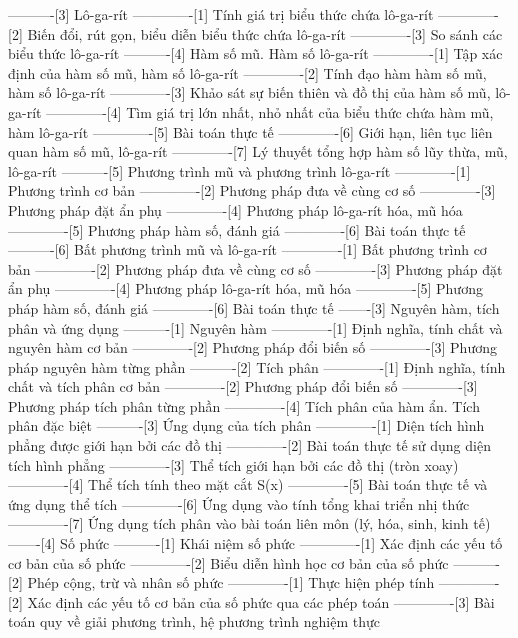 ----------[3] Lô-ga-rít
-------------[1] Tính giá trị biểu thức chứa lô-ga-rít
-------------[2] Biến đổi, rút gọn, biểu diễn biểu thức chứa lô-ga-rít
-------------[3] So sánh các biểu thức lô-ga-rít
----------[4] Hàm số mũ. Hàm số lô-ga-rít
-------------[1] Tập xác định của hàm số mũ, hàm số lô-ga-rít
-------------[2] Tính đạo hàm hàm số mũ, hàm số lô-ga-rít
-------------[3] Khảo sát sự biến thiên và đồ thị của hàm số mũ, lô-ga-rít
-------------[4] Tìm giá trị lớn nhất, nhỏ nhất của biểu thức chứa hàm mũ, hàm lô-ga-rít
-------------[5] Bài toán thực tế
-------------[6] Giới hạn, liên tục liên quan hàm số mũ, lô-ga-rít
-------------[7] Lý thuyết tổng hợp hàm số lũy thừa, mũ, lô-ga-rít
----------[5] Phương trình mũ và phương trình lô-ga-rít
-------------[1] Phương trình cơ bản
-------------[2] Phương pháp đưa về cùng cơ số
-------------[3] Phương pháp đặt ẩn phụ
-------------[4] Phương pháp lô-ga-rít hóa, mũ hóa
-------------[5] Phương pháp hàm số, đánh giá
-------------[6] Bài toán thực tế
----------[6] Bất phương trình mũ và lô-ga-rít
-------------[1] Bất phương trình cơ bản
-------------[2] Phương pháp đưa về cùng cơ số
-------------[3] Phương pháp đặt ẩn phụ
-------------[4] Phương pháp lô-ga-rít hóa, mũ hóa
-------------[5] Phương pháp hàm số, đánh giá
-------------[6] Bài toán thực tế
-------[3] Nguyên hàm, tích phân và ứng dụng
----------[1] Nguyên hàm
-------------[1] Định nghĩa, tính chất và nguyên hàm cơ bản
-------------[2] Phương pháp đổi biến số
-------------[3] Phương pháp nguyên hàm từng phần
----------[2] Tích phân
-------------[1] Định nghĩa, tính chất và tích phân cơ bản
-------------[2] Phương pháp đổi biến số
-------------[3] Phương pháp tích phân từng phần
-------------[4] Tích phân của hàm ẩn. Tích phân đặc biệt
----------[3] Ứng dụng của tích phân
-------------[1] Diện tích hình phẳng được giới hạn bởi các đồ thị
-------------[2] Bài toán thực tế sử dụng diện tích hình phẳng
-------------[3] Thể tích giới hạn bởi các đồ thị (tròn xoay)
-------------[4] Thể tích tính theo mặt cắt S(x)
-------------[5] Bài toán thực tế và ứng dụng thể tích
-------------[6] Ứng dụng vào tính tổng khai triển nhị thức
-------------[7] Ứng dụng tích phân vào bài toán liên môn (lý, hóa, sinh, kinh tế)
-------[4] Số phức
----------[1] Khái niệm số phức
-------------[1] Xác định các yếu tố cơ bản của số phức
-------------[2] Biểu diễn hình học cơ bản của số phức
----------[2] Phép cộng, trừ và nhân số phức
-------------[1] Thực hiện phép tính
-------------[2] Xác định các yếu tố cơ bản của số phức qua các phép toán
-------------[3] Bài toán quy về giải phương trình, hệ phương trình nghiệm thực
